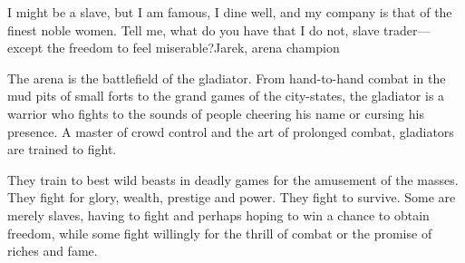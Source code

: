 {I might be a slave, but I am famous, I dine well, and my company is that of the finest noble women. Tell me, what do you have that I do not, slave trader---except the freedom to feel miserable?}{Jarek, arena champion}


The arena is the battlefield of the gladiator. From hand-to-hand combat in the mud pits of small forts to the grand games of the city-states, the gladiator is a warrior who fights to the sounds of people cheering his name or cursing his presence. A master of crowd control and the art of prolonged combat, gladiators are trained to fight.

They train to best wild beasts in deadly games for the amusement of the masses. They fight for glory, wealth, prestige and power. They fight to survive. Some are merely slaves, having to fight and perhaps hoping to win a chance to obtain freedom, while some fight willingly for the thrill of combat or the promise of riches and fame.


